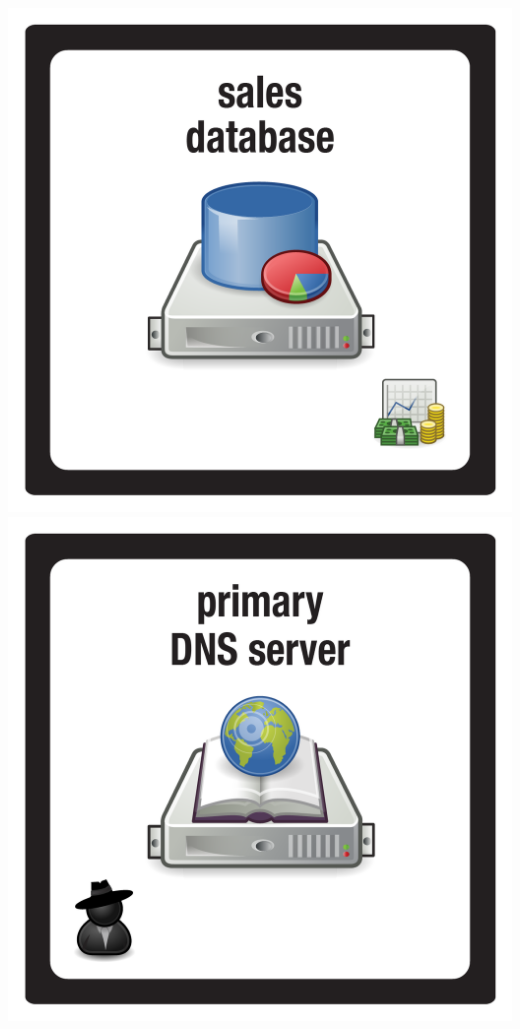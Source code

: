 \documentclass{letter}
\begin{document}
\includegraphics{tiles/node_sales_db}
\includegraphics{tiles/node_primary_dns} \\
\end{document}
